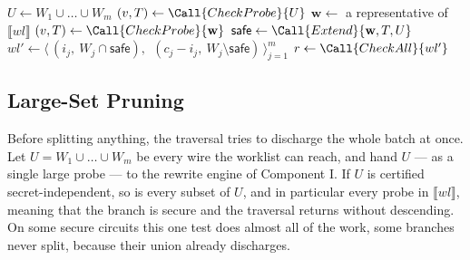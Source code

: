 \begin{algorithm}
\caption{Traversing the subset space (Component II)}
\label{alg:subset-space}
\begin{algorithmic}[1]
   \Return \Secure{}  \EndIf
  \State $U \gets W_1 \cup \dots \cup W_m$
  \State $(v, T) \gets \Call{CheckProbe}{U}$ 
   \Return \Secure{} \EndIf
  \State $\mathbf{w} \gets$ a representative of $\llbracket wl \rrbracket$ 
  \State $(v, T) \gets \Call{CheckProbe}{\mathbf{w}}$ 
   \Return \Insecure{} \EndIf
  \State $\mathsf{safe} \gets \Call{Extend}{\mathbf{w}, T, U}$ 
    \State $wl' \gets \big\langle\, (i_j,\ W_j \cap \mathsf{safe}),\ \ (c_j - i_j,\ W_j \setminus \mathsf{safe}) \,\big\rangle_{j=1}^{m}$ 
    \State $r \gets \Call{CheckAll}{wl'}$
     \Return \Insecure{} \EndIf
  \EndFor
  \State \Return \Secure{}
\EndFunction
\end{algorithmic}
\end{algorithm}

  \subsection{Large-Set Pruning}
  \label{sec:large-set-pruning}

  Before splitting anything, the traversal tries to discharge the whole batch at
  once. Let $U = W_1 \cup \dots \cup W_m$ be every wire the worklist can reach,
  and hand $U$ --- as a single large probe --- to the rewrite engine of Component I. If
  $U$ is certified secret-independent, so is every subset of $U$, and in
  particular every probe in $\llbracket wl \rrbracket$, meaning that the branch is secure and
  the traversal returns without descending. On some secure circuits this one test
  does almost all of the work, some branches never split, because their union
  already discharges.

